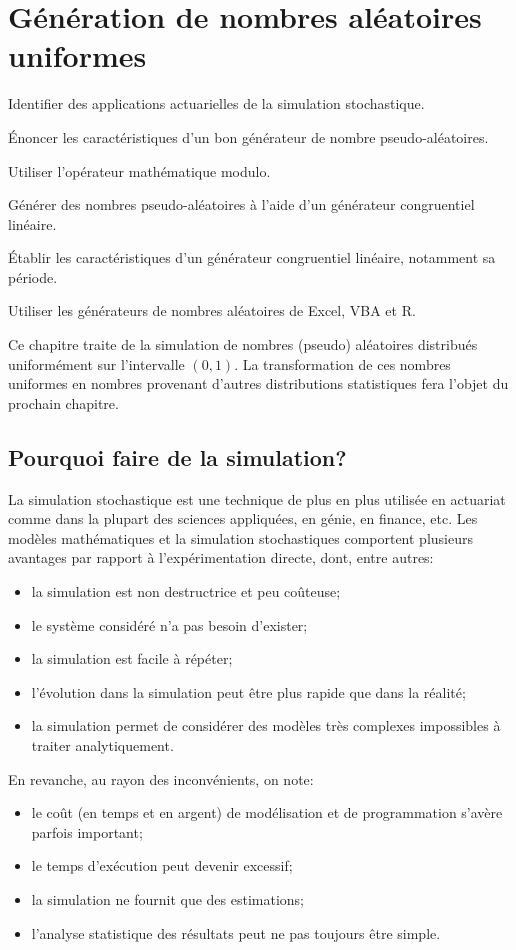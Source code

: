 \chapter{Génération de nombres aléatoires uniformes}
\label{chap:generation}

\begin{objectifs}
\item Identifier des applications actuarielles de la simulation
  stochastique.
\item Énoncer les caractéristiques d'un bon générateur de nombre
  pseudo-aléatoires.
\item Utiliser l'opérateur mathématique modulo.
\item Générer des nombres pseudo-aléatoires à l'aide d'un générateur
  congruentiel linéaire.
\item Établir les caractéristiques d'un générateur congruentiel
  linéaire, notamment sa période.
\item Utiliser les générateurs de nombres aléatoires de Excel, VBA et
  R.
\end{objectifs}

Ce chapitre traite de la simulation de nombres (pseudo) aléatoires
distribués uniformément sur l'intervalle $(0, 1)$. La transformation
de ces nombres uniformes en nombres provenant d'autres distributions
statistiques fera l'objet du prochain chapitre.


\section{Pourquoi faire de la simulation?}
\label{sec:generation:pourquoi}

La simulation stochastique est une technique de plus en plus utilisée
en actuariat comme dans la plupart des sciences appliquées, en génie,
en finance, etc. Les modèles mathématiques et la simulation
stochastiques comportent plusieurs avantages par rapport à
l'expérimentation directe, dont, entre autres:
\begin{itemize}
\item la simulation est non destructrice et peu coûteuse;
\item le système considéré n'a pas besoin d'exister;
\item la simulation est facile à répéter;
\item l'évolution dans la simulation peut être plus rapide que dans la
  réalité;
\item la simulation permet de considérer des modèles très complexes
  impossibles à traiter analytiquement.
\end{itemize}
En revanche, au rayon des inconvénients, on note:
\begin{itemize}
\item le coût (en temps et en argent) de modélisation et de
  programmation s'avère parfois important;
\item le temps d'exécution peut devenir excessif;
\item la simulation ne fournit que des estimations;
\item l'analyse statistique des résultats peut ne pas toujours être
  simple.
\end{itemize}

